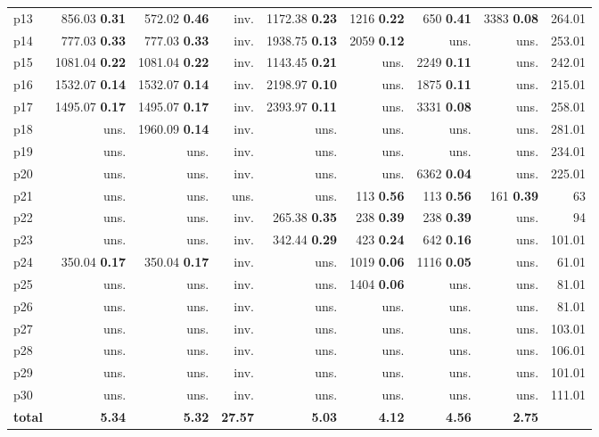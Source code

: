 \begin{tabular}{|l|rrrrrrr|r|}
p13 & {\footnotesize 856.03} \textbf{0.31} & {\footnotesize 572.02} \textbf{0.46} & inv. & {\footnotesize 1172.38} \textbf{0.23} & {\footnotesize 1216} \textbf{0.22} & {\footnotesize 650} \textbf{0.41} & {\footnotesize 3383} \textbf{0.08} & 264.01\\
p14 & {\footnotesize 777.03} \textbf{0.33} & {\footnotesize 777.03} \textbf{0.33} & inv. & {\footnotesize 1938.75} \textbf{0.13} & {\footnotesize 2059} \textbf{0.12} & uns. & uns. & 253.01\\
p15 & {\footnotesize 1081.04} \textbf{0.22} & {\footnotesize 1081.04} \textbf{0.22} & inv. & {\footnotesize 1143.45} \textbf{0.21} & uns. & {\footnotesize 2249} \textbf{0.11} & uns. & 242.01\\
p16 & {\footnotesize 1532.07} \textbf{0.14} & {\footnotesize 1532.07} \textbf{0.14} & inv. & {\footnotesize 2198.97} \textbf{0.10} & uns. & {\footnotesize 1875} \textbf{0.11} & uns. & 215.01\\
p17 & {\footnotesize 1495.07} \textbf{0.17} & {\footnotesize 1495.07} \textbf{0.17} & inv. & {\footnotesize 2393.97} \textbf{0.11} & uns. & {\footnotesize 3331} \textbf{0.08} & uns. & 258.01\\
p18 & uns. & {\footnotesize 1960.09} \textbf{0.14} & inv. & uns. & uns. & uns. & uns. & 281.01\\
p19 & uns. & uns. & inv. & uns. & uns. & uns. & uns. & 234.01\\
p20 & uns. & uns. & inv. & uns. & uns. & {\footnotesize 6362} \textbf{0.04} & uns. & 225.01\\
p21 & uns. & uns. & uns. & uns. & {\footnotesize 113} \textbf{0.56} & {\footnotesize 113} \textbf{0.56} & {\footnotesize 161} \textbf{0.39} & 63\\
p22 & uns. & uns. & inv. & {\footnotesize 265.38} \textbf{0.35} & {\footnotesize 238} \textbf{0.39} & {\footnotesize 238} \textbf{0.39} & uns. & 94\\
p23 & uns. & uns. & inv. & {\footnotesize 342.44} \textbf{0.29} & {\footnotesize 423} \textbf{0.24} & {\footnotesize 642} \textbf{0.16} & uns. & 101.01\\
p24 & {\footnotesize 350.04} \textbf{0.17} & {\footnotesize 350.04} \textbf{0.17} & inv. & uns. & {\footnotesize 1019} \textbf{0.06} & {\footnotesize 1116} \textbf{0.05} & uns. & 61.01\\
p25 & uns. & uns. & inv. & uns. & {\footnotesize 1404} \textbf{0.06} & uns. & uns. & 81.01\\
p26 & uns. & uns. & inv. & uns. & uns. & uns. & uns. & 81.01\\
p27 & uns. & uns. & inv. & uns. & uns. & uns. & uns. & 103.01\\
p28 & uns. & uns. & inv. & uns. & uns. & uns. & uns. & 106.01\\
p29 & uns. & uns. & inv. & uns. & uns. & uns. & uns. & 101.01\\
p30 & uns. & uns. & inv. & uns. & uns. & uns. & uns. & 111.01\\
\hline
\textbf{total} & \textbf{5.34} & \textbf{5.32} & \textbf{27.57} & \textbf{5.03} & \textbf{4.12} & \textbf{4.56} & \textbf{2.75} & \\
\hline
\end{tabular}

